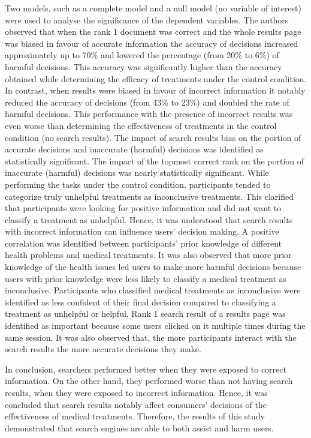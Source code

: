 \documentclass[]{article}
\begin{document}
Two models, such as a complete model and a null model (no variable of interest) were used to analyse the significance of the dependent variables. The authors observed that when the rank 1 document was correct and the whole results page was biased in favour of accurate information the accuracy of decisions increased approximately up to 70\% and lowered the percentage (from 20\% to 6\%) of harmful decisions. This accuracy was significantly higher than the accuracy obtained while determining the efficacy of treatments under the control condition. In contrast, when results were biased in favour of incorrect information it notably reduced the accuracy of decisions (from 43\% to 23\%) and doubled the rate of harmful decisions. This performance with the presence of incorrect results was even worse than determining the effectiveness of treatments in the control condition (no search results). The impact of search results bias on the portion of accurate decisions and inaccurate (harmful) decisions was identified as statistically significant. The impact of the topmost correct rank on the portion of inaccurate (harmful) decisions was nearly statistically significant. While performing the tasks under the control condition, participants tended to categorize truly unhelpful treatments as inconclusive treatments. This clarified that participants were looking for positive information and did not want to classify a treatment as unhelpful. Hence, it was understood that search results with incorrect information can influence users' decision making. A positive correlation was identified between participants' prior knowledge of different health problems and medical treatments. It was also observed that more prior knowledge of the health issues led users to make more harmful decisions because users with prior knowledge were less likely to classify a medical treatment as inconclusive. Participants who classified medical treatments as inconclusive were identified as less confident of their final decision compared to classifying a treatment as unhelpful or helpful. Rank 1 search result of a results page was identified as important because some users clicked on it multiple times during the same session. It was also observed that, the more participants interact with the search results the more accurate decisions they make.

In conclusion, searchers performed better when they were exposed to correct information. On the other hand, they performed worse than not having search results, when they were exposed to incorrect information. Hence, it was concluded that search results notably affect consumers' decisions of the effectiveness of medical treatments. Therefore, the results of this study demonstrated that search engines are able to both assist and harm users. 
\end{document}
